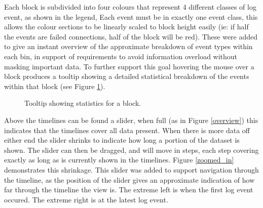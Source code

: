 Each block is subdivided into four colours that represent 4 different classes of log event, as shown in the legend, Each event must be in exactly one event class, this allows the colour sections to be linearly scaled to block height easily (ie: if half the events are failed connections, half of the block will be red). These were added to give an instant overview of the approximate breakdown of event types within each bin, in support of requirements to avoid information overload without masking important data. To further support this goal hovering the mouse over a block produces a tooltip showing a detailed statistical breakdown of the events within that block (see Figure \ref{des_tooltip}). 

\begin{figure}[tbh]
\caption{\protect\label{des_tooltip}Tooltip showing statistics for a block.}
\end{figure}

Above the timelines can be found a slider, when full (as in Figure \ref{overview}) this indicates that the timelines cover all data present. When there is more data off either end the slider shrinks to indicate how long a portion of the dataset is shown. The slider can then be dragged, and will move in steps, each step covering exactly as long as is currently shown in the timelines. Figure \ref{zoomed_in} demonstrates this shrinkage. This slider was added to support navigation through the timeline, as the position of the slider gives an approximate indication of how far through the timeline the view is. The extreme left is when the first log event occured. The extreme right is at the latest log event.

